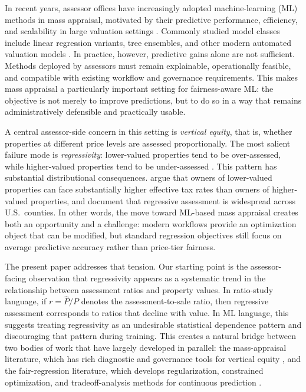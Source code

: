 \documentclass[12pt]{article}
\theoremstyle{plain}
\theoremstyle{definition}
\begin{document}
In recent years, assessor offices have increasingly adopted machine-learning (ML) methods in mass appraisal, motivated by their predictive performance, efficiency, and scalability in large valuation settings \cite{IAAOAITaskForce2022,BidansetRakow2022,Rootetal2023}. Commonly studied model classes include linear regression variants, tree ensembles, and other modern automated valuation models \cite{Rootetal2023,Ostrikova2024,Sevgen2024100111}. In practice, however, predictive gains alone are not sufficient. Methods deployed by assessors must remain explainable, operationally feasible, and compatible with existing workflow and governance requirements. This makes mass appraisal a particularly important setting for fairness-aware ML: the objective is not merely to improve predictions, but to do so in a way that remains administratively defensible and practically usable.

A central assessor-side concern in this setting is \emph{vertical equity}, that is, whether properties at different price levels are assessed proportionally. The most salient failure mode is \emph{regressivity}: lower-valued properties tend to be over-assessed, while higher-valued properties tend to be under-assessed \cite{McMillen2020,IAAO2023VerticalReview,McMillenSingh2023}. This pattern has substantial distributional consequences. \textcite{amornsiripanitch2020why} argue that owners of lower-valued properties can face substantially higher effective tax rates than owners of higher-valued properties, and \textcite{Berry2021} document that regressive assessment is widespread across U.S.\ counties. In other words, the move toward ML-based mass appraisal creates both an opportunity and a challenge: modern workflows provide an optimization object that can be modified, but standard regression objectives still focus on average predictive accuracy rather than price-tier fairness.

The present paper addresses that tension. Our starting point is the assessor-facing observation that regressivity appears as a systematic trend in the relationship between assessment ratios and property values. In ratio-study language, if \(r=\hat P/P\) denotes the assessment-to-sale ratio, then regressive assessment corresponds to ratios that decline with value. In ML language, this suggests treating regressivity as an undesirable statistical dependence pattern and discouraging that pattern during training. This creates a natural bridge between two bodies of work that have largely developed in parallel: the mass-appraisal literature, which has rich diagnostic and governance tools for vertical equity \cite{IAAO2025ExposureRatio,McMillenSingh2023,Rootetal2023}, and the fair-regression literature, which develops regularization, constrained optimization, and tradeoff-analysis methods for continuous prediction \cite{AgarwalDudikWu2019,FitzsimonsEtAl2019,lee2022maximal,LiEtAl2022Fairness,CatonHaas2024}.
\end{document}
